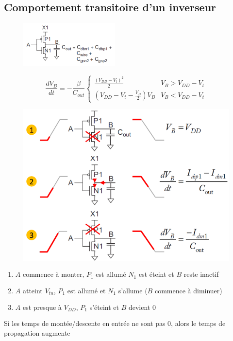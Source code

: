 \documentclass[resume]{subfiles}
\begin{document}
\begin{multicols}{3}
\subsection{Comportement transitoire d'un inverseur}
\begin{figure}[H]
\centering
\includegraphics[width=5.00cm]{img_38.png}
\end{figure}
$$\frac{dV_B}{dt}=-\frac{\beta}{C_{out}}\begin{cases}\frac{(V_{DD}-V_{t})^2}{2} & V_B > V_{DD} - V_t\\
\left(V_{DD}-V_{t}-\frac{V_B}{2}\right)V_{B} & V_B<V_{DD}-V_t\end{cases}$$
\begin{figure}[H]
\centering
\includegraphics[width=\columnwidth]{img_39.png}
\end{figure}
\begin{enumerate}
\item $A$ commence à monter, $P_1$ est allumé $N_1$ est éteint et $B$ reste inactif
\item $A$ atteint $V_{tn}$, $P_1$ est allumé et $N_1$ s'allume ($B$ commence à diminuer)
\item $A$ est presque à $V_{DD}$, $P_1$ s'éteint et $B$ devient 0
\end{enumerate}
Si les temps de montée/descente en entrée ne sont pas 0, alors le temps de propagation augmente

\end{multicols}
\end{document}
